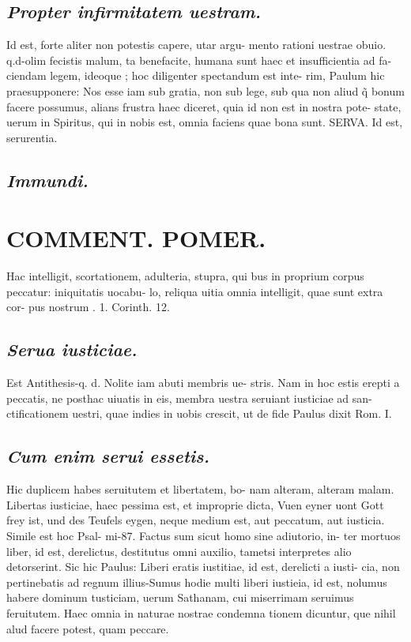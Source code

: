 \documentclass{article}
\begin{document}
\begin{pages}
\subsection*{\textit{Propter infirmitatem uestram. }}\pstart Id est, forte aliter non potestis capere, utar argu- mento rationi uestrae obuio. q.d-olim fecistis malum, ta benefacite, humana sunt haec et insufficientia ad fa- ciendam legem, ideoque ; hoc diligenter spectandum est inte- rim, Paulum hic praesupponere: Nos esse iam sub gratia, non sub lege, sub qua non aliud q̃ bonum facere possumus, alians frustra haec diceret, quia id non est in nostra pote- state, uerum in Spiritus, qui in nobis est, omnia faciens quae bona sunt. SERVA. Id est, serurentia.   \pend
{}
{}
\subsection*{\textit{Immundi. }}
{}
\subsection*{\textit{}}
\section*{COMMENT. POMER.  }\pstart Hac intelligit, scortationem, adulteria, stupra, qui bus in proprium corpus peccatur: iniquitatis uocabu- lo, reliqua uitia omnia intelligit, quae sunt extra cor- pus nostrum . 1. Corinth. 12.   \pend
{}
{}
\subsection*{\textit{Serua iusticiae. }}\pstart Est Antithesis-q. d. Nolite iam abuti membris ue- stris. Nam in hoc estis erepti a peccatis, ne posthac uiuatis in eis, membra uestra seruiant iusticiae ad san- ctificationem uestri, quae indies in uobis crescit, ut de fide Paulus dixit Rom. I.   \pend
{}
{}
\subsection*{\textit{Cum enim serui essetis. }}\pstart Hic duplicem habes seruitutem et libertatem, bo- nam alteram, alteram malam. Libertas iusticiae, haec pessima est, et improprie dicta, Vuen eyner uont Gott frey ist, und des Teufels eygen, neque medium est, aut peccatum, aut iusticia. Simile est hoc Psal- mi-87. Factus sum sicut homo sine adiutorio, in- ter mortuos liber, id est, derelictus, destitutus omni auxilio, tametsi interpretes alio detorserint. Sic hic Paulus: Liberi eratis iustitiae, id est, derelicti a iusti- cia, non pertinebatis ad regnum illius-Sumus hodie multi liberi iustieia, id est, nolumus habere dominum tusticiam, uerum Sathanam, cui miserrimam seruimus feruitutem. Haec omnia in naturae nostrae condemna tionem dicuntur, que nihil alud facere potest, quam peccare.   \pend

\end{pages}
\end{document}

